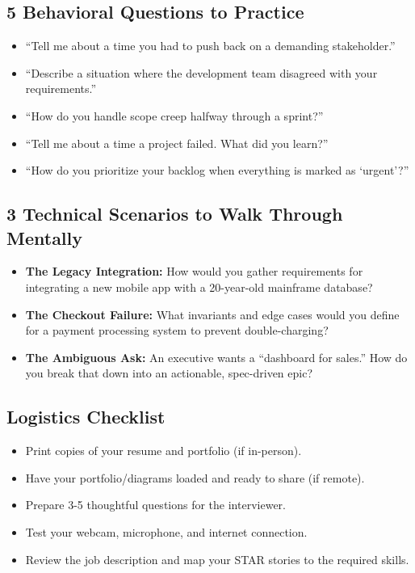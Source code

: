 \documentclass[
  11pt,
  openany,
  oneside]{book}
\providecommand{\tightlist}{%
  \setlength{\itemsep}{0pt}\setlength{\parskip}{0pt}}
\begin{document}
\subsection{5 Behavioral Questions to
Practice}\label{behavioral-questions-to-practice}

\begin{itemize}
\tightlist
\item
  ``Tell me about a time you had to push back on a demanding
  stakeholder.''
\item
  ``Describe a situation where the development team disagreed with your
  requirements.''
\item
  ``How do you handle scope creep halfway through a sprint?''
\item
  ``Tell me about a time a project failed. What did you learn?''
\item
  ``How do you prioritize your backlog when everything is marked as
  `urgent'?''
\end{itemize}

\subsection{3 Technical Scenarios to Walk Through
Mentally}\label{technical-scenarios-to-walk-through-mentally}

\begin{itemize}
\tightlist
\item
  \textbf{The Legacy Integration:} How would you gather requirements for
  integrating a new mobile app with a 20-year-old mainframe database?
\item
  \textbf{The Checkout Failure:} What invariants and edge cases would
  you define for a payment processing system to prevent double-charging?
\item
  \textbf{The Ambiguous Ask:} An executive wants a ``dashboard for
  sales.'' How do you break that down into an actionable, spec-driven
  epic?
\end{itemize}

\subsection{Logistics Checklist}\label{logistics-checklist}

\begin{itemize}
\tightlist
\item
  Print copies of your resume and portfolio (if in-person).
\item
  Have your portfolio/diagrams loaded and ready to share (if remote).
\item
  Prepare 3-5 thoughtful questions for the interviewer.
\item
  Test your webcam, microphone, and internet connection.
\item
  Review the job description and map your STAR stories to the required
  skills.
\end{itemize}
\end{document}
